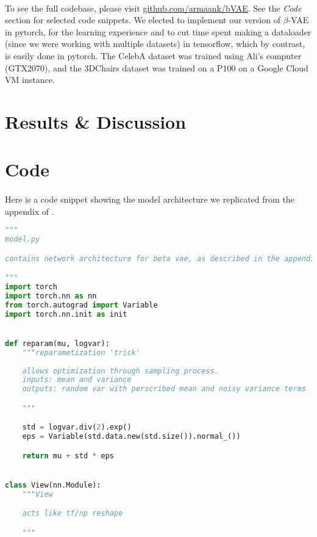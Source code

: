 \documentclass[justified,nobib]{tufte-handout}
\begin{document}
\begin{fullwidth}
\paragraph{} To see the full codebase, please visit \underline{\href{https://github.com/armaank/bVAE}{github.com/armaank/bVAE}}. See the \textit{Code} section for selected code snippets. We elected to implement our version of $\beta$-VAE in pytorch, for the learning experience and to cut time spent making a dataloader (since we were working with multiple datasets) in tensorflow, which by contrast, is easily done in pytorch. The CelebA dataset was trained using Ali's computer (GTX2070), and the 3DChairs dataset was trained on a P100 on a Google Cloud VM instance. 
 
\clearpage
\section{Results \& Discussion}


\clearpage
\section{Code}
\paragraph{} Here is a code snippet showing the model architecture we replicated from the appendix of \cite{bvae}.
\begin{lstlisting}[language=Python]
"""
model.py

contains network architecture for beta vae, as described in the appendix of [2]

"""
import torch
import torch.nn as nn
from torch.autograd import Variable
import torch.nn.init as init


def reparam(mu, logvar):
    """reparametization 'trick'
    
    allows optimization through sampling process.
    inputs: mean and variance
    outputs: random var with perscribed mean and noisy variance terms

    """

    std = logvar.div(2).exp()
    eps = Variable(std.data.new(std.size()).normal_())

    return mu + std * eps


class View(nn.Module):
    """View

    acts like tf/np reshape

    """


\end{lstlisting}
\end{fullwidth}
\end{document}
